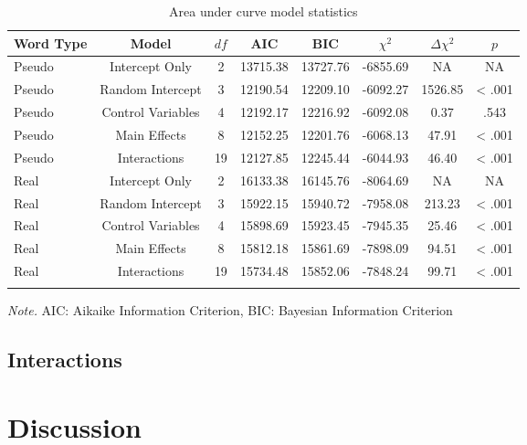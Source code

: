 \documentclass[english,man]{apa6}
\theoremstyle{definition}
\theoremstyle{definition}
\theoremstyle{definition}
\theoremstyle{remark}
\begin{document}
\begin{table}[tbp]
\begin{center}
\begin{threeparttable}
\caption{\label{tab:model-table2}Area under curve model statistics}
\begin{tabular}{lccccccc}
\toprule
Word Type & Model & $df$ & AIC & BIC & $\chi^2$ & $\Delta\chi^2$ & $p$\\
\midrule
Pseudo & Intercept Only & 2 & 13715.38 & 13727.76 & -6855.69 & NA & NA\\
Pseudo & Random Intercept & 3 & 12190.54 & 12209.10 & -6092.27 & 1526.85 & < .001\\
Pseudo & Control Variables & 4 & 12192.17 & 12216.92 & -6092.08 & 0.37 & .543\\
Pseudo & Main Effects & 8 & 12152.25 & 12201.76 & -6068.13 & 47.91 & < .001\\
Pseudo & Interactions & 19 & 12127.85 & 12245.44 & -6044.93 & 46.40 & < .001\\
Real & Intercept Only & 2 & 16133.38 & 16145.76 & -8064.69 & NA & NA\\
Real & Random Intercept & 3 & 15922.15 & 15940.72 & -7958.08 & 213.23 & < .001\\
Real & Control Variables & 4 & 15898.69 & 15923.45 & -7945.35 & 25.46 & < .001\\
Real & Main Effects & 8 & 15812.18 & 15861.69 & -7898.09 & 94.51 & < .001\\
Real & Interactions & 19 & 15734.48 & 15852.06 & -7848.24 & 99.71 & < .001\\
\bottomrule
\addlinespace
\end{tabular}
\begin{tablenotes}[para]
\textit{Note.} AIC: Aikaike Information Criterion, BIC: Bayesian Information Criterion
\end{tablenotes}
\end{threeparttable}
\end{center}
\end{table}

\subsection{Interactions}\label{interactions-1}

\section{Discussion}\label{discussion}
\end{document}

